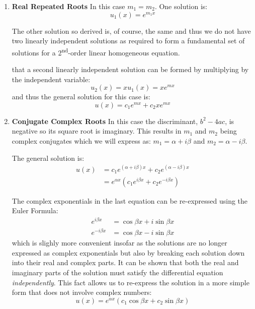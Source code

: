 \begin{enumerate}
\item \textbf{Real Repeated Roots}
In this case $m_1 = m_2$.  One solution is:
\begin{equation}
u_1(x) = e^{m_1x}
\end{equation}

The other solution so derived is, of course, the same and thus we do not have two linearly independent solutions as required to form a fundamental set of solutions for a 2\textsuperscript{nd}-order linear homogeneous equation.  

 that a second linearly independent solution can be formed by multiplying by the independent variable:
\begin{equation*}
u_2(x) = x u_1(x) = xe^{mx}
\end{equation*}
and thus the general solution for this case is:
\begin{equation}
u(x) = c_1e^{mx}+c_2xe^{mx}
\label{eq:rep-real-roots}
\end{equation}

\item \textbf{Conjugate Complex Roots}
In this case the discriminant, $b^2-4ac$, is negative so its square root is imaginary.  This results in $m_1$ and $m_2$ being complex conjugates which we will express as: $m_1 = \alpha + i\beta$ and $m_2 = \alpha - i\beta$.

The general solution is:
\begin{align*}
u(x) &= c_1e^{(\alpha + i\beta)x}+c_2e^{(\alpha - i\beta)x} \\
&=e^{\alpha x}\left(c_1e^{i\beta x} + c_2e^{-i\beta x} \right) 
\end{align*}

The complex exponentials in the last equation can be re-expressed using the Euler Formula:
\begin{align*}
e^{i\beta x} &= \cos{\beta x} + i \sin{\beta x} \\
e^{-i\beta x} &= \cos{\beta x} - i \sin{\beta x}
\end{align*}
which is slighly more convenient insofar as the solutions are no longer expressed as complex exponentials but also by breaking each solution down into their real and complex parts. It can be shown that both the real and imaginary parts of the solution must satisfy the differential equation \emph{independently}.  This fact allows us to re-express the solution in a more simple form that does not involve complex numbers:
\begin{equation}
u(x) = e^{\alpha x}\left(c_1 \cos{\beta x} + c_2 \sin{\beta x} \right)
\label{eq:cmplx-conj-roots}
\end{equation}


\end{enumerate}
